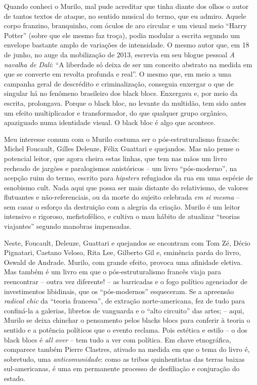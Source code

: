\textbf{}Quando conheci o Murilo, mal pude acreditar que tinha diante
dos olhos o autor de tantos textos de ataque, no sentido musical do
termo, que eu admiro. Aquele corpo franzino, branquinho, com óculos de
aro circular e um visual meio ``Harry Potter'' (sobre que ele mesmo faz
troça), podia modular a escrita segundo um envelope bastante amplo de
variações de intensidade. O mesmo autor que, em 18 de junho, no auge da
mobilização de 2013, escrevia em seu blogue pessoal \emph{A navalha de
Dali}: ``A liberdade só deixa de ser um conceito abstrato na medida em
que se converte em revolta profunda e real''. O mesmo que, em meio a uma
campanha geral de descrédito e criminalização, conseguia enxergar o que
de singular há no fenômeno brasileiro dos black blocs. Enxergava e, por
meio da escrita, prolongava. Porque o black bloc, no levante da
multidão, tem sido antes um efeito multiplicador e transformador, do que
qualquer grupo orgânico, apaziguado numa identidade visual. O black bloc
é algo que acontece.

Meu interesse comum com o Murilo costuma ser o pós-estruturalismo
francês: Michel Foucault, Gilles Deleuze, Félix Guattari e quejandos.
Mas não pense o potencial leitor, que agora cheira estas linhas, que tem
nas mãos um livro recheado de jargões e paralogismos anistóricos -- um
livro ``pós-moderno'', na acepção ruim do termo, escrito para
\emph{hipsters} refugiados da rua em uma espécie de esnobismo cult. Nada
aqui que possa ser mais distante do relativismo, de valores flutuantes e
não-referenciais, ou da morte do sujeito celebrada \emph{em si mesma} --
sem casar o esforço da destruição com a alegria da criação. Murilo é um
leitor intensivo e rigoroso, mefistofélico, e cultiva o mau hábito de
atualizar ``teorias viajantes'' segundo manobras impensadas.

Neste, Foucault, Deleuze, Guattari e quejandos se encontram com Tom Zé,
Décio Pignatari, Caetano Veloso, Rita Lee, Gilberto Gil e, eminência
parda do livro, Oswald de Andrade. Murilo, com grande efeito, provoca
uma afinidade eletiva. Mas também é um livro em que o pós-estruturalismo
francês viaja para reencontrar -- outra vez diferente! -- as barricadas
e o fogo político agenciador de investimentos libidinais, que os
``pós-modernos'' esqueceram. Se a apreensão \emph{radical chic} da
``teoria francesa'', de extração norte-americana, fez de tudo para
confiná-la a galerias, libretos de vanguarda e o ``alto circuito'' das
artes; -- aqui, Murilo se deixa chinchar o pensamento pelos blacks blocs
para conferir à teoria o sentido e a potência políticos que o evento
reclama. Pois estética e estilo -- o dos black blocs é \emph{all over}
-- tem tudo a ver com política. Em chave etnográfica, comparece também
Pierre Clastres, ativado na medida em que o tema do livro é, sobretudo,
uma \emph{anticomunidade}: como as tribos quinhentistas das terras
baixas sul-americanas, é uma em permanente processo de desfiliação e
conjuração do estado.

